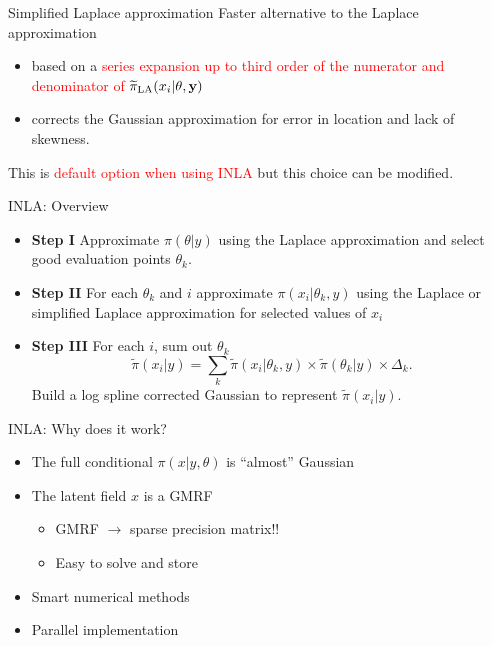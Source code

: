 \documentclass[
  ignorenonframetext,
]{beamer}
\providecommand{\tightlist}{%
  \setlength{\itemsep}{0pt}\setlength{\parskip}{0pt}}
\begin{document}
\begin{frame}{Simplified Laplace approximation}
\protect\hypertarget{simplified-laplace-approximation}{}
Faster alternative to the Laplace approximation\\

\begin{itemize}
\tightlist
\item
  based on a \textcolor{red}{series
   expansion up to third order of the numerator and denominator of $\widetilde{\pi}_\text{LA}(x_i|\bf{\theta}, \bf{y})$}
\item
  corrects the Gaussian approximation for error in location and lack of
  skewness.
\end{itemize}

\pause

This is \textcolor{red}{default option when using INLA} but this choice
can be modified.
\end{frame}

\begin{frame}{INLA: Overview}
\protect\hypertarget{inla-overview}{}
\begin{itemize}
\item
  \textbf{Step I} Approximate \(\pi({\theta}|y)\) using the Laplace
  approximation and select good evaluation points \({\theta}_k\).
\item
  \textbf{Step II} For each \({\theta}_k\) and \(i\) approximate
  \(\pi(x_i|{\theta}_k, {y})\) using the Laplace or simplified Laplace
  approximation for selected values of \(x_i\)
\item
  \textbf{Step III} For each \(i\), sum out \({\theta}_k\)
  \[                
  \widetilde{\pi}(x_i|{y}) = \sum_k \widetilde{\pi}(x_i|{\theta}_k, {y}) \times
                    \widetilde{\pi}({\theta}_k|{y}) \times \Delta_k.
  \] Build a log spline corrected Gaussian to represent
  \(\widetilde{\pi}(x_i|{y})\).
\end{itemize}
\end{frame}

\begin{frame}{INLA: Why does it work?}
\protect\hypertarget{inla-why-does-it-work}{}
\begin{itemize}
\item
  The full conditional \(\pi(x|y,\theta)\) is ``almost'' Gaussian
\item
  The latent field \(x\) is a GMRF

  \begin{itemize}
  \tightlist
  \item
    GMRF \(\rightarrow\) sparse precision matrix!!
  \item
    Easy to solve and store
  \end{itemize}
\item
  Smart numerical methods
\item
  Parallel implementation
\end{itemize}
\end{frame}
\end{document}
